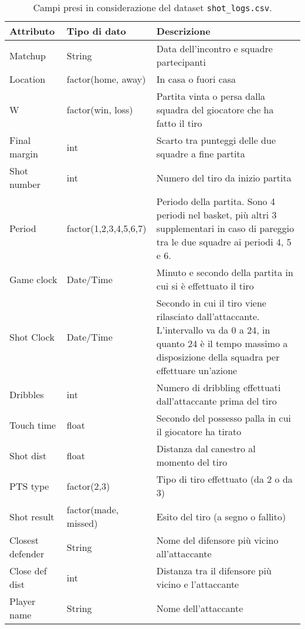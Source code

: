 \begin{center}
	\begin{longtable}[m]{|m{8em} m{7em} m{16em}|} 

		\caption{Campi presi in considerazione del dataset \texttt{shot\_logs.csv}.\label{long}}\\

		\hline
		\bfseries{Attributo} & \bfseries{Tipo di dato} & \bfseries{Descrizione} \\
		\hline
		Matchup & String & Data dell'incontro e squadre partecipanti \\
		\hline
		Location & factor(home, away) & In casa o fuori casa \\
		\hline
		W & factor(win, loss) & Partita vinta o persa dalla squadra del giocatore che ha fatto il tiro \\ 
		\hline
		Final margin & int & Scarto tra punteggi delle due squadre a fine partita \\ 
		\hline
		Shot number & int & Numero del tiro da inizio partita \\ 
		\hline
		Period & factor(1,2,3,4,5,6,7) & Periodo della partita. Sono 4 periodi nel basket, più altri 3 supplementari in caso di pareggio tra le due squadre ai periodi 4, 5 e 6. \\ 
		\hline
		Game clock & Date/Time & Minuto e secondo della partita in cui si è effettuato il tiro \\ 
		\hline
		Shot Clock & Date/Time & Secondo in cui il tiro viene rilasciato dall’attaccante. L’intervallo va da 0 a 24, in quanto 24 è il tempo massimo a disposizione della squadra per effettuare un’azione \\ 
		\hline
		Dribbles & int & Numero di dribbling effettuati dall’attaccante prima del tiro \\ 
		\hline
		Touch time & float & Secondo del possesso palla in cui il giocatore ha tirato \\ 
		\hline
		Shot dist & float & Distanza dal canestro al momento del tiro \\ 
		\hline
		PTS type & factor(2,3) & Tipo di tiro effettuato (da 2 o da 3) \\ 
		\hline
		Shot result & factor(made, missed) & Esito del tiro (a segno o fallito) \\ 
		\hline
		Closest defender & String & Nome del difensore più vicino all’attaccante \\ 
		\hline
		Close def dist & int & Distanza tra il difensore più vicino e l’attaccante \\ 
		\hline
		Player name & String & Nome dell’attaccante \\ 
		\hline
	\end{longtable}
\end{center}

